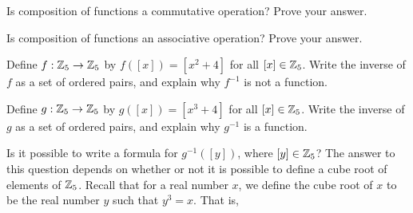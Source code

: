 \item 
	\ba
	\item Is composition of functions a commutative operation? Prove your answer.
	\item Is composition of functions an associative operation? Prove your answer. 
	\ea

\begin{comment}

\ExerciseSolution

\ba

\item The answer is no. Let $f: \R \to \R$ be defined by $f(x) = 2x+1$ and let $g : \R \to \R$ be defined by $g(x) = x-1$. Then 
\[(f \circ g)(1) = f(g(1)) = f(0) = 1 \text{ while } (g \circ f)(1) = g(f(1)) = g(3) = 2.\]
So $f \circ g \neq g \circ f$. 

\item The answer is yes. Let $A$, $B$, $C$, and $D$ be sets and let $f: A \to B$, $g: B \to C$, and $h : C \to D$ be functions. Let $x \in A$. Then 
\begin{align*}
((f \circ g) \circ h)(x) &= (f \circ g)(h(x)) \\
	&= f(g(h(x))) \\
	&= f(g \circ h)(x)) \\
	&= (f \circ (g \circ h))(x).
\end{align*}
So $(f \circ g) \circ h = f \circ (g \circ h)$ and composition of functions is associative.

\ea


\end{comment}


\item 
\ba
\item Define $f: \mathbb{Z}_5 \to \mathbb{Z}_5$ by $f\left( [x] \right) = \left[x^2 + 4 \right]$ for all $[x] \in \mathbb{Z}_5$.  Write the inverse of $f$ as a set of ordered pairs, and explain why $f^{-1}$ is not a function.

\item Define $g: \mathbb{Z}_5 \to \mathbb{Z}_5$ by $g\left( [x] \right) = \left[x^3 + 4 \right]$ for all $[x] \in \mathbb{Z}_5$.  Write the inverse of $g$ as a set of ordered pairs, and explain why $g^{-1}$ is a function.

\item Is it possible to write a formula for $g^{-1}\left( [y] \right)$, where $[y] \in \mathbb{Z}_5$?  The answer to this question depends on whether or not it is possible to define a cube root of elements of $\mathbb{Z}_5$.  Recall that for a real number $x$, we define the cube root of $x$ to be the real number $y$ such that $y^3 = x$.  That is,

